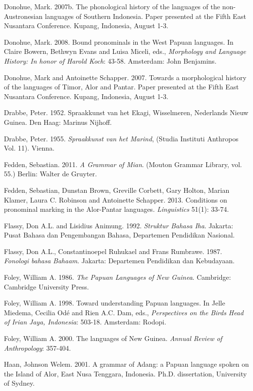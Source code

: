 Donohue, Mark. 2007b. The phonological history of the languages of the non-Austronesian languages of Southern Indonesia. Paper presented at the Fifth East Nusantara Conference. Kupang, Indonesia, August 1-3.

Donohue, Mark. 2008. Bound pronominals in the West Papuan languages. In Claire Bowern, Bethwyn Evans and Luisa Miceli, eds., \textit{Morphology and Language History: In honor of Harold Koch}: 43-58. Amsterdam: John Benjamins.

Donohue, Mark and Antoinette Schapper. 2007. Towards a morphological history of the languages of Timor, Alor and Pantar. Paper presented at the Fifth East Nusantara Conference. Kupang, Indonesia, August 1-3.

Drabbe, Peter. 1952. Spraakkunst van het Ekagi, Wisselmeren, Nederlands Nieuw Guinea. Den Haag: Marinus Nijhoff.

Drabbe, Peter. 1955. \textit{Spraakkunst van het Marind}, (Studia Instituti Anthropos Vol. 11). Vienna.

Fedden, Sebastian. 2011. \textit{A Grammar of Mian}. (Mouton Grammar Library, vol. 55.) Berlin: Walter de Gruyter.

Fedden, Sebastian, Dunstan Brown, Greville Corbett, Gary Holton, Marian Klamer, Laura C. Robinson and Antoinette Schapper. 2013. Conditions on pronominal marking in the Alor-Pantar languages. \textit{Linguistics} 51(1): 33-74.

Flassy, Don A.L. and Lisidius Animung. 1992. \textit{Struktur Bahasa Iha}. Jakarta: Pusat Bahasa dan Pengembangan Bahasa, Departemen Pendidikan Nasional.

Flassy, Don A.L., Constantinoepel Ruhukael and Frans Rumbrawe. 1987. \textit{Fonologi bahasa Bahaam}. Jakarta: Departemen Pendidikan dan Kebudayaan.

Foley, William A. 1986. \textit{The Papuan Languages of New Guinea}. Cambridge: Cambridge University Press.

Foley, William A. 1998. Toward understanding Papuan languages. In Jelle Miedema, Cecilia  Od\'e and Rien A.C. Dam, eds., \textit{Perspectives on the Bird{\textquotesingle}s Head of Irian Jaya, Indonesia}: 503-18. Amsterdam: Rodopi.

Foley, William A. 2000. The languages of New Guinea. \textit{Annual Review of Anthropology}: 357-404.

Haan, Johnson Welem. 2001. A grammar of Adang: a Papuan language spoken on the Island of Alor, East Nusa Tenggara, Indonesia. Ph.D. dissertation, University of Sydney.

